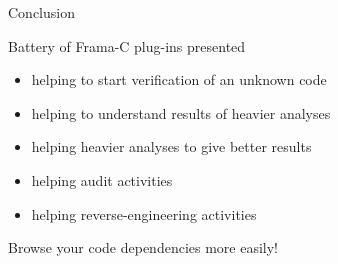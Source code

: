 \documentclass{beamer}
\newcommand{\orange}[1]{{\textcolor{frama-c-1}{#1}}}
\newcommand{\vvert}[1]{{\textcolor{vert}{#1}}}
\newcommand{\intro}[1]{\begin{center}\vvert{#1}\end{center}}
\newenvironment{sect}[1]{\orange{#1}\begin{itemize}}{\end{itemize}}
\begin{document}

\begin{frame}{Conclusion}

  \intro{Battery of Frama-C plug-ins presented}

\begin{sect}{For what purpose}
\item helping to start verification of an unknown code
\item helping to understand results of heavier analyses
\item helping heavier analyses to give better results
\item helping audit activities 
\item helping reverse-engineering activities 
\end{sect}

\intro{Browse your code dependencies more easily!}

\end{frame}
\end{document}
